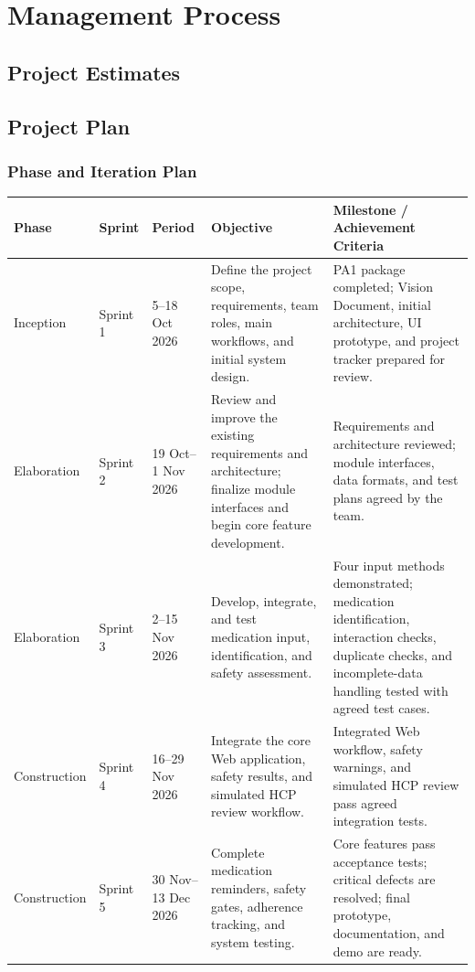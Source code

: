\section{Management Process}

\subsection{Project Estimates}


\subsection{Project Plan}

\subsubsection{Phase and Iteration Plan}

\begin{longtable}{|L{0.14\textwidth}|L{0.10\textwidth}|L{0.17\textwidth}|L{0.23\textwidth}|L{0.24\textwidth}|}
\hline
\textbf{Phase} & \textbf{Sprint} & \textbf{Period} &
\textbf{Objective} &
\textbf{Milestone / Achievement Criteria}\\ \hline

Inception
& Sprint 1
& 5--18 Oct 2026
& Define the project scope, requirements, team roles,
main workflows, and initial system design.
& PA1 package completed; Vision Document, initial
architecture, UI prototype, and project tracker
prepared for review.
\\ \hline

Elaboration
& Sprint 2
& 19 Oct--1 Nov 2026
& Review and improve the existing requirements and
architecture; finalize module interfaces and
begin core feature development.
& Requirements and architecture reviewed;
module interfaces, data formats, and test
plans agreed by the team.
\\ \hline

Elaboration
& Sprint 3
& 2--15 Nov 2026
& Develop, integrate, and test medication input,
identification, and safety assessment.
& Four input methods demonstrated;
medication identification, interaction checks,
duplicate checks, and incomplete-data handling
tested with agreed test cases.
\\ \hline

Construction
& Sprint 4
& 16--29 Nov 2026
& Integrate the core Web application, safety results,
and simulated HCP review workflow.
& Integrated Web workflow, safety warnings,
and simulated HCP review pass agreed
integration tests.
\\ \hline

Construction
& Sprint 5
& 30 Nov--13 Dec 2026
& Complete medication reminders, safety gates,
adherence tracking, and system testing.
& Core features pass acceptance tests;
critical defects are resolved; final prototype,
documentation, and demo are ready.
\\ \hline

\end{longtable}

